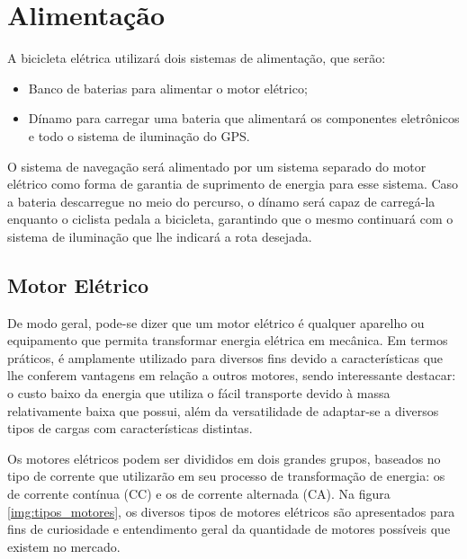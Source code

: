   \section{Alimentação}
  A bicicleta elétrica utilizará dois sistemas de alimentação, que serão:
  \begin{itemize}
  	\item Banco de baterias para alimentar o motor elétrico;
  	\item Dínamo para carregar uma bateria que alimentará os componentes eletrônicos e todo o sistema de iluminação do GPS. 
  \end{itemize}
  
	O sistema de navegação será alimentado por um sistema separado do motor elétrico como forma de garantia de suprimento de energia para esse sistema. Caso a bateria descarregue no meio do percurso, o dínamo será capaz de carregá-la enquanto o ciclista pedala a bicicleta, garantindo que o mesmo continuará com o sistema de iluminação que lhe indicará a rota desejada.
	
	\subsection{Motor Elétrico}
	De modo geral, pode-se dizer que um motor elétrico é qualquer aparelho ou equipamento que permita transformar energia elétrica em mecânica. Em termos práticos, é amplamente utilizado para diversos fins devido a características que lhe conferem vantagens em relação a outros motores, sendo interessante destacar: o custo baixo da energia que utiliza o fácil transporte devido à massa relativamente baixa que possui, além da versatilidade de adaptar-se a diversos tipos de cargas com características distintas.

	Os motores elétricos podem ser divididos em dois grandes grupos, baseados no tipo de corrente que utilizarão em seu processo de transformação de energia: os de corrente contínua (CC) e os de corrente alternada (CA). Na figura \ref{img:tipos_motores}, os diversos tipos de motores elétricos são apresentados para fins de curiosidade e entendimento geral da quantidade de motores possíveis que existem no mercado.	

